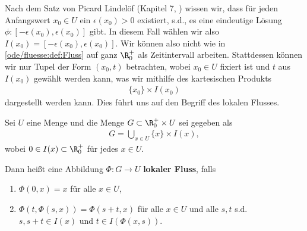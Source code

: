 \documentclass[letterpaper,10pt,english]{jupyterBook}
\begin{document}
Nach dem Satz von Picard Lindelöf (Kapitel 7, \cite{Ten21}) wissen wir, dass für jeden Anfangswert \(x_0\in U\) ein \(\epsilon(x_0) >0\) existiert, s.d., es eine eindeutige Lösung \(\phi: [-\epsilon(x_0), \epsilon(x_0)]\) gibt. In diesem Fall wählen wir also \(I(x_0)=[-\epsilon(x_0), \epsilon(x_0)]\). Wir können also nicht wie in \cref{ode/fluesse:def:Fluss} auf ganz \(\R^+_0\) als Zeitintervall arbeiten. Stattdessen können wir nur Tupel der Form \((x_0, t)\) betrachten, wobei \(x_0\in U\) fixiert ist und \(t\) aus \(I(x_0)\) gewählt werden kann, was wir mithilfe des kartesischen Produkts
\begin{align*}
\{x_0\}\times I(x_0)
\end{align*}
dargestellt werden kann. Dies führt uns auf den Begriff des lokalen Flusses.
\label{ode/fluesse:def:LokFluss}
\begin{definition}{}{}



Sei \(U\) eine Menge und die Menge \(G\subset \R^+_0\times U\) sei gegeben als
\begin{align*}
G = \bigcup_{x\in U} \{x\}\times I(x),
\end{align*}
wobei \(0\in I(x)\subset \R^+_0\) für jedes \(x\in U\).

Dann heißt eine Abbildung \(\Phi: G\rightarrow U\) \textbf{lokaler Fluss}, falls
\begin{enumerate}

\item {} 
\(\Phi(0,x) = x\) für alle \(x\in U\),

\item {} 
\(\Phi(t, \Phi(s, x)) = \Phi(s+t, x)\) für alle \(x\in U\) und alle \(s,t\) s.d. \(s, s+t\in I(x)\) und \(t\in I(\Phi(x,s))\).

\end{enumerate}
\end{definition}
\end{document}
